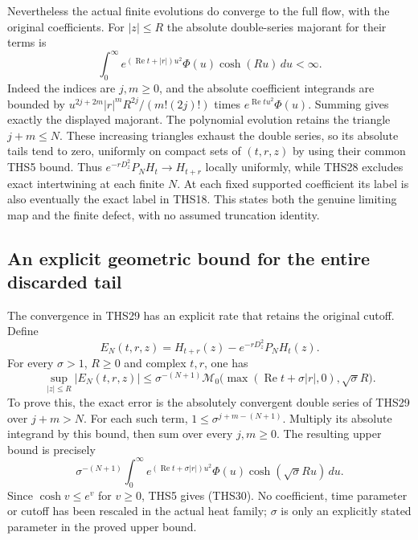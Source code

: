 \documentclass[11pt]{article}
\theoremstyle{definition}
\begin{document}
Nevertheless the actual finite evolutions do converge to the
full flow, with the original coefficients. For $|z|\le R$ the
absolute double-series majorant for their terms is
\begin{equation}\tag{THS29}
 \int_0^\infty
 e^{(\operatorname{Re}t+|r|)u^2}\Phi(u)\cosh(Ru)\,du<\infty.
\end{equation}
Indeed the indices are $j,m\ge0$, and the absolute coefficient
integrands are bounded by
$u^{2j+2m}|r|^mR^{2j}/(m!(2j)!)$ times
$e^{\operatorname{Re}tu^2}\Phi(u)$. Summing gives exactly
the displayed majorant. The polynomial evolution retains the
triangle $j+m\le N$. These increasing triangles exhaust the
double series, so its absolute tails tend to zero, uniformly
on compact sets of $(t,r,z)$ by using their common THS5 bound.
Thus $e^{-rD_z^2}P_NH_t\to H_{t+r}$ locally uniformly, while
THS28 excludes exact intertwining at each finite $N$.
At each fixed supported coefficient its label is also eventually
the exact label in THS18. This states both the genuine limiting
map and the finite defect, with no assumed truncation identity.

\subsection{An explicit geometric bound for the entire discarded tail}

The convergence in THS29 has an explicit rate that retains the
original cutoff. Define
\[
 E_N(t,r,z)=H_{t+r}(z)-e^{-rD_z^2}P_NH_t(z).
\]
For every $\sigma>1$, $R\ge0$ and complex $t,r$, one has
\begin{equation}\tag{THS30}
 \sup_{|z|\le R}|E_N(t,r,z)|
 \le\sigma^{-(N+1)}
 \mathcal M_0\bigl(\max(\operatorname{Re}t+\sigma|r|,0),
                         \sqrt\sigma R\bigr).
\end{equation}
To prove this, the exact error is the absolutely convergent
double series of THS29 over $j+m>N$. For each such term,
$1\le\sigma^{j+m-(N+1)}$. Multiply its absolute integrand by
this bound, then sum over every $j,m\ge0$. The resulting upper
bound is precisely
\[
 \sigma^{-(N+1)}\int_0^\infty
 e^{(\operatorname{Re}t+\sigma|r|)u^2}\Phi(u)
                  \cosh(\sqrt\sigma R u)\,du.
\]
Since $\cosh v\le e^v$ for $v\ge0$, THS5 gives (THS30).
No coefficient, time parameter or cutoff has been rescaled in
the actual heat family; $\sigma$ is only an explicitly stated
parameter in the proved upper bound.
\end{document}
